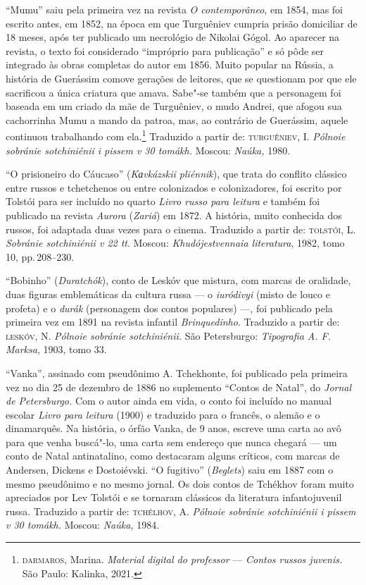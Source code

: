 {``Mumu'' saiu pela primeira vez na revista \emph{O contemporâneo}, em
1854, mas foi escrito antes, em 1852, na época em que Turguêniev cumpria
prisão domiciliar de 18 meses, após ter publicado um necrológio de
Nikolai Gógol. Ao aparecer na revista, o texto foi considerado
``impróprio para publicação'' e só pôde ser integrado às obras completas
do autor em 1856. Muito popular na Rússia, a história de Guerássim
comove gerações de leitores, que se questionam por que ele sacrificou a
única criatura que amava. Sabe"-se também que a personagem foi baseada em
um criado da mãe de Turguêniev, o mudo Andrei, que afogou sua
cachorrinha Mumu a mando da patroa, mas, ao contrário de Guerássim, aquele
continuou trabalhando com ela.\footnote{\scriptsize\textsc{darmaros}, Marina. \emph{Material digital
  do professor} --- \emph{Contos russos juvenis.} São Paulo: Kalinka, 2021.}
Traduzido a partir de:
\textsc{turguêniev}, I. \emph{Pólnoie sobránie sotchiniénii i pissem v 30
tomákh.} Moscou: \emph{Naúka,} 1980.

\medskip

``O prisioneiro do Cáucaso'' (\emph{Kаvkázskii pliénnik}), que trata do
conflito clássico entre russos e tchetchenos ou entre colonizados e
colonizadores, foi escrito por Tolstói para ser incluído no quarto \emph{Livro russo
para leitura} e também foi publicado na revista \emph{Aurora}
(\emph{Zariá}) em 1872. A história, muito conhecida dos russos,
foi adaptada duas vezes para o cinema.
Traduzido a partir de:
\textsc{tolstói}, L. \emph{Sobránie sotchiniénii v 22 tt}. Moscou:
\emph{Khudójestvennaia literatura}, 1982, tomo 10, pp.\,208--230.

\medskip

``Bobinho'' (\emph{Duratchók}), conto de Leskóv que mistura, com marcas
de oralidade, duas figuras
emblemáticas da cultura russa --- o \emph{iuródivyi} (misto de louco e
profeta) e o \emph{durák} (personagem dos contos populares) ---, foi
publicado pela primeira vez em 1891 na revista infantil
\emph{Brinquedinho}. Traduzido a partir de:
\textsc{leskóv}, N. \emph{Pólnoie sobránie sotchiniénii.} São Petersburgo:
\emph{Tipografia A. F. Marksa}, 1903, tomo 33.

\medskip

``Vanka'', assinado com pseudônimo A. Tchekhonte, foi publicado pela
primeira vez no dia 25 de dezembro de 1886 no suplemento ``Contos de
Natal'', do \emph{Jornal de Petersburgo.} Com o autor ainda em vida, o
conto foi incluído no manual escolar \emph{Livro para leitura} (1900) e
traduzido para o francês, o alemão e o dinamarquês. Na história, o órfão
Vanka, de 9 anos, escreve uma carta ao avô para que venha buscá"-lo, uma
carta sem endereço que nunca chegará --- um conto de Natal
antinatalino, como destacaram alguns críticos, com marcas de Andersen,
Dickens e Dostoiévski. ``O fugitivo'' (\emph{Beglets}) saiu em 1887 com
o mesmo pseudônimo e no mesmo jornal. Os dois contos de Tchékhov foram muito
apreciados por Lev Tolstói e se tornaram clássicos da literatura
infantojuvenil russa.
Traduzido a partir de:
\textsc{tchélhov}, A. \emph{Pólnoie sobránie sotchiniénii i pissem v 30 tomákh.}
Moscou: \emph{Naúka,} 1984.

}
